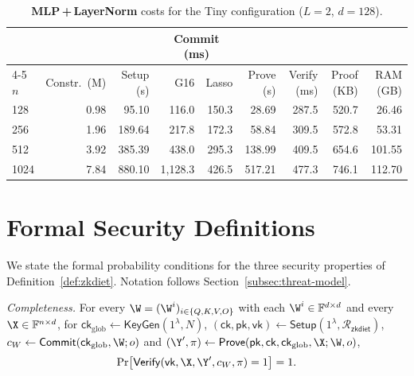 \begin{table}[!t]
\centering
\caption{\textbf{MLP\,+\,LayerNorm} costs for the Tiny configuration ($L{=}2$, $d{=}128$).}
\label{tab:mlp-costs}
\footnotesize
\setlength{\tabcolsep}{4pt}
\begin{tabular}{@{} l rrrrrrrr @{}}
\toprule
& & & \multicolumn{2}{c}{Commit (ms)} & & & & \\
\cmidrule(lr){4-5}
$n$ & Constr.\ (M) & Setup (s) & G16 & Lasso & Prove (s) & Verify (ms) & Proof (KB) & RAM (GB) \\
\midrule
128  & 0.98  & 95.10  & 116.0 & 150.3 & 28.69  & 287.5 & 520.7      & 26.46 \\
256  & 1.96  & 189.64 & 217.8 & 172.3 & 58.84  & 309.5 & 572.8      & 53.31 \\
512  & 3.92  & 385.39 & 438.0 & 295.3 & 138.99 & 409.5 & 654.6      & 101.55 \\
1024 & 7.84  & 880.10 & 1{,}128.3 & 426.5 & 517.21 & 477.3 & 746.1     & 112.70 \\
\bottomrule
\end{tabular}
\end{table}

\section{Formal Security Definitions}
\label{appx:security-defs}

We state the formal probability conditions for the three security properties of Definition~\ref{def:zkdiet}. Notation follows Section~\ref{subsec:threat-model}.

\smallskip
\noindent\emph{Completeness.} For every $\W = (\W^{i})_{i \in \{Q,K,V,O\}}$ with each $\W^{i} \in \mathbb{F}^{d \times d}$ and every $\X \in \mathbb{F}^{n \times d}$, for $\mathsf{ck}_{\mathrm{glob}} \leftarrow \mathsf{KeyGen}(1^{\lambda}, N)$, $(\mathsf{ck}, \mathsf{pk}, \mathsf{vk}) \leftarrow \mathsf{Setup}(1^{\lambda}, \mathcal{R}_{\mathsf{zkdiet}})$, $c_{W} \leftarrow \mathsf{Commit}(\mathsf{ck}_{\mathrm{glob}}, \W; o)$ and $(\Y', \pi) \leftarrow \mathsf{Prove}(\mathsf{pk}, \mathsf{ck}, \mathsf{ck}_{\mathrm{glob}}, \X; \W, o)$,
\[
    \Pr\bigl[\mathsf{Verify}(\mathsf{vk}, \X, \Y', c_{W}, \pi) = 1\bigr] = 1 .
\]

